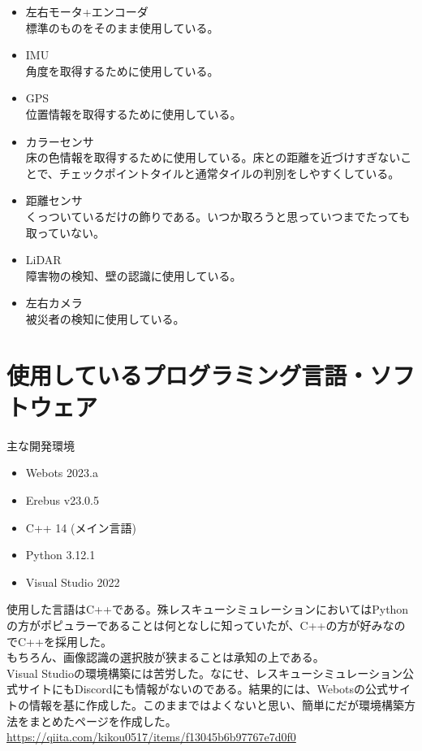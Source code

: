 \documentclass[uplatex,dvipdfmx,a4paper]{jsarticle}
\begin{document}
    \begin{itemize}
      \item 左右モータ+エンコーダ\\標準のものをそのまま使用している。
      \item IMU\\角度を取得するために使用している。
      \item GPS\\位置情報を取得するために使用している。
      \item カラーセンサ\\床の色情報を取得するために使用している。床との距離を近づけすぎないことで、チェックポイントタイルと通常タイルの判別をしやすくしている。
      \item 距離センサ\\くっついているだけの飾りである。いつか取ろうと思っていつまでたっても取っていない。
      \item LiDAR\\障害物の検知、壁の認識に使用している。
      \item 左右カメラ\\被災者の検知に使用している。
    \end{itemize}
  

  \section{使用しているプログラミング言語・ソフトウェア}
  \noindent
  主な開発環境
  \begin{itemize}
    \item Webots 2023.a
    \item Erebus v23.0.5
    \item C++ 14 (メイン言語)
    \item Python 3.12.1
    \item Visual Studio 2022
  \end{itemize}

  使用した言語はC++である。殊レスキューシミュレーションにおいてはPythonの方がポピュラーであることは何となしに知っていたが、C++の方が好みなのでC++を採用した。\\
  もちろん、画像認識の選択肢が狭まることは承知の上である。\\

  Visual Studioの環境構築には苦労した。なにせ、レスキューシミュレーション公式サイトにもDiscordにも情報がないのである。結果的には、Webotsの公式サイトの情報を基に作成した。このままではよくないと思い、簡単にだが環境構築方法をまとめたページを作成した。\url{https://qiita.com/kikou0517/items/f13045b6b97767e7d0f0}\\
  
\end{document}
